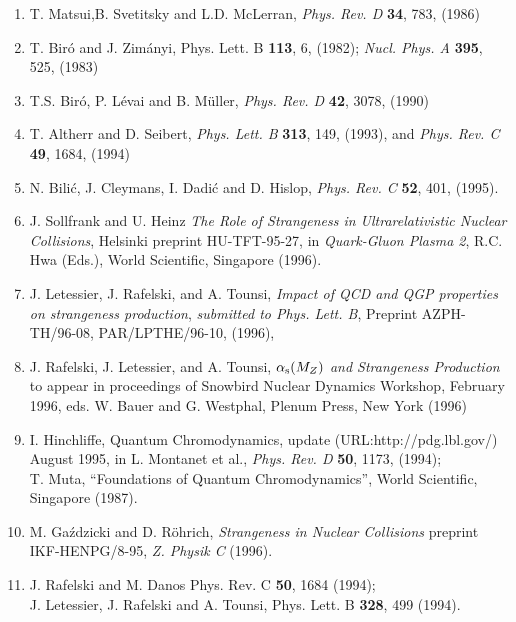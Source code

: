 \begin{mdframed}[linecolor=gray,roundcorner=12pt,backgroundcolor=Dandelion!15,linewidth=1pt,leftmargin=0cm,rightmargin=0cm,topline=true,bottomline=true,skipabove=12pt]
{\begin{enumerate}
\item%
T. Matsui,B. Svetitsky and L.D. McLerran, 
{\it Phys. Rev. D} {\bf 34}, 783, (1986) 

\item%
T. Bir\'o and J. Zim\'anyi, {Phys. Lett. B} {\bf 113}, 6,
(1982); {\it Nucl. Phys. A} {\bf 395}, 525, (1983) 
 
 
\item%
T.S. Bir\'o, P. L\'evai and B. M\"uller, 
{\it Phys. Rev. D} {\bf 42}, 3078, (1990) 

\item%
T. Altherr and D. Seibert, {\it Phys. Lett. B}
{\bf 313}, 149, (1993), and {\it Phys. Rev. C} {\bf 49}, 1684, (1994) 
 
\item%
N. Bili\'c, J. Cleymans, I. Dadi\'c and D. Hislop,
{\it Phys. Rev. C}  {\bf 52}, 401, (1995).  

\item%
J. Sollfrank and U. Heinz {\it The Role of
Strangeness in Ultrarelativistic Nuclear Collisions}, Helsinki
preprint HU-TFT-95-27, in {\it Quark-Gluon Plasma 2},
R.C. Hwa (Eds.), World Scientific, Singapore (1996).

\item%
J. Letessier,  J. Rafelski,  and A. Tounsi,
{\it Impact of QCD and QGP properties on strangeness production},
{\it submitted to  Phys. Lett. B}, Preprint 
AZPH-TH/96-08, PAR/LPTHE/96-10,  (1996),
 
\item%
J. Rafelski, J. Letessier,  and A. Tounsi,
{\it $\alpha_{\rm s}(M_Z)$ and Strangeness Production}
to appear in proceedings of Snowbird Nuclear 
Dynamics Workshop, February 1996, eds. W. Bauer 
and G. Westphal,  Plenum Press, New York (1996)


 
\item%
I. Hinchliffe, {Quantum Chromodynamics}, 
update (URL:http://pdg.lbl.gov/) August 1995, in  
L. Montanet {et al.}, 
{\it Phys. Rev. D} {\bf 50}, 1173, (1994);\\
T. Muta, ``Foundations of Quantum Chromodynamics'', 
World Scientific, Singapore (1987).

\item%
M. Ga\'zdzicki and D. R\"ohrich, 
{\it Strangeness in Nuclear Collisions}
preprint IKF-HENPG/8-95, {\it Z. Physik C} (1996).

\item%
J. Rafelski and M. Danos {Phys. Rev.} C {\bf 50}, 1684 (1994);\\  
J. Letessier, J. Rafelski and A. Tounsi, {Phys. Lett.} B {\bf 328}, 499
(1994).
\end{enumerate}
}
\end{mdframed}
\vskip 0.5cm

